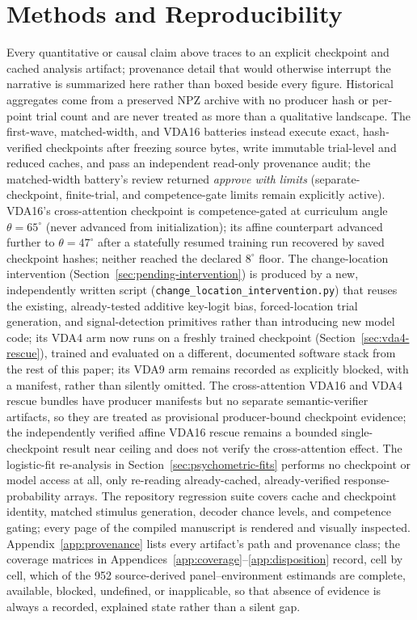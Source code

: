 \documentclass[10pt]{article}
\begin{document}
\section{Methods and Reproducibility}\label{sec:methods}
Every quantitative or causal claim above traces to an explicit checkpoint and cached analysis artifact; provenance detail that would otherwise interrupt the narrative is summarized here rather than boxed beside every figure. Historical aggregates come from a preserved NPZ archive with no producer hash or per-point trial count and are never treated as more than a qualitative landscape. The first-wave, matched-width, and VDA16 batteries instead execute exact, hash-verified checkpoints after freezing source bytes, write immutable trial-level and reduced caches, and pass an independent read-only provenance audit; the matched-width battery's review returned \emph{approve with limits} (separate-checkpoint, finite-trial, and competence-gate limits remain explicitly active). VDA16's cross-attention checkpoint is competence-gated at curriculum angle $\theta=65^\circ$ (never advanced from initialization); its affine counterpart advanced further to $\theta=47^\circ$ after a statefully resumed training run recovered by saved checkpoint hashes; neither reached the declared $8^\circ$ floor. The change-location intervention (Section~\ref{sec:pending-intervention}) is produced by a new, independently written script (\texttt{change\_location\_intervention.py}) that reuses the existing, already-tested additive key-logit bias, forced-location trial generation, and signal-detection primitives rather than introducing new model code; its VDA4 arm now runs on a freshly trained checkpoint (Section~\ref{sec:vda4-rescue}), trained and evaluated on a different, documented software stack from the rest of this paper; its VDA9 arm remains recorded as explicitly blocked, with a manifest, rather than silently omitted. The cross-attention VDA16 and VDA4 rescue bundles have producer manifests but no separate semantic-verifier artifacts, so they are treated as provisional producer-bound checkpoint evidence; the independently verified affine VDA16 rescue remains a bounded single-checkpoint result near ceiling and does not verify the cross-attention effect. The logistic-fit re-analysis in Section~\ref{sec:psychometric-fits} performs no checkpoint or model access at all, only re-reading already-cached, already-verified response-probability arrays. The repository regression suite covers cache and checkpoint identity, matched stimulus generation, decoder chance levels, and competence gating; every page of the compiled manuscript is rendered and visually inspected. Appendix~\ref{app:provenance} lists every artifact's path and provenance class; the coverage matrices in Appendices~\ref{app:coverage}--\ref{app:disposition} record, cell by cell, which of the 952 source-derived panel--environment estimands are complete, available, blocked, undefined, or inapplicable, so that absence of evidence is always a recorded, explained state rather than a silent gap.
\end{document}
